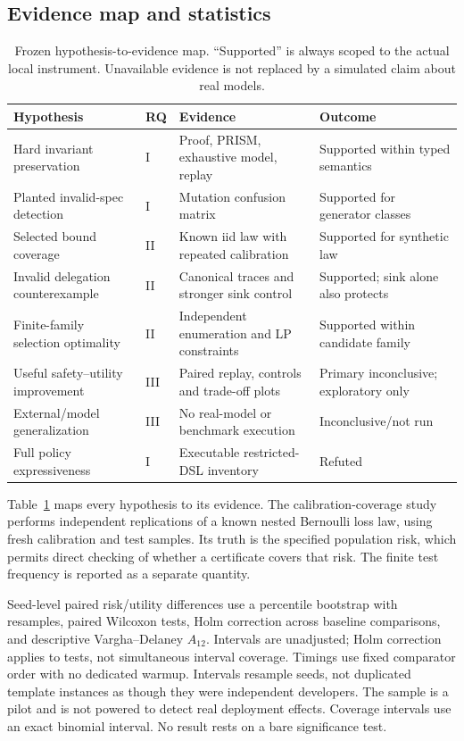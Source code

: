 \documentclass[lettersize,journal]{IEEEtran}
\begin{document}
\subsection{Evidence map and statistics}
\begin{table}[t]
\caption{Frozen hypothesis-to-evidence map. ``Supported'' is always scoped to
the actual local instrument. Unavailable evidence is not replaced by a simulated
claim about real models.}
\label{tab:hypotheses}
\centering\small
\begin{tabular}{llll}
\hline
Hypothesis & RQ & Evidence & Outcome\\
\hline
Hard invariant preservation & I & Proof, PRISM, exhaustive model, replay & Supported within typed semantics\\
Planted invalid-spec detection & I & Mutation confusion matrix & Supported for generator classes\\
Selected bound coverage & II & Known iid law with repeated calibration & Supported for synthetic law\\
Invalid delegation counterexample & II & Canonical traces and stronger sink control & Supported; sink alone also protects\\
Finite-family selection optimality & II & Independent enumeration and LP constraints & Supported within candidate family\\
Useful safety--utility improvement & III & Paired replay, controls and trade-off plots & Primary inconclusive; exploratory only\\
External/model generalization & III & No real-model or benchmark execution & Inconclusive/not run\\
Full policy expressiveness & I & Executable restricted-DSL inventory & Refuted\\
\hline
\end{tabular}
\end{table}

Table~\ref{tab:hypotheses} maps every hypothesis to its evidence. The
calibration-coverage study performs \resPrimaryReplications{} independent
replications of a known nested Bernoulli loss law, using fresh calibration and
test samples. Its truth is the specified population risk, which permits direct
checking of whether a certificate covers that risk. The finite test frequency
is reported as a separate quantity.

Seed-level paired risk/utility differences use a percentile bootstrap with
\resBootstrapCount{} resamples, paired Wilcoxon tests, Holm correction across
baseline comparisons, and descriptive Vargha--Delaney $A_{12}$. Intervals are
unadjusted; Holm correction applies to tests, not simultaneous interval
coverage. Timings use fixed comparator order with no dedicated warmup. Intervals
resample seeds, not duplicated template instances as though they were
independent developers. The sample is a pilot and is not powered to detect
real deployment effects. Coverage intervals use an exact binomial interval.
No result rests on a bare significance test.
\end{document}
